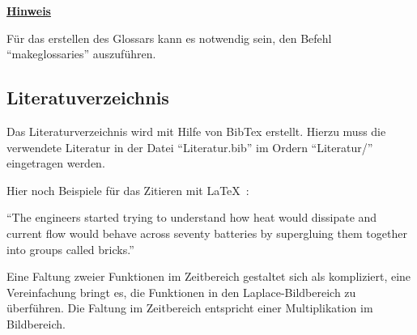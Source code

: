 \underline{\textbf{Hinweis}}

Für das erstellen des Glossars kann es notwendig sein, den Befehl \enquote{makeglossaries} auszuführen.

\subsection{Literatuverzeichnis}

Das Literaturverzeichnis wird mit Hilfe von BibTex erstellt. Hierzu muss die verwendete Literatur in der Datei \enquote{Literatur.bib} im Ordern \enquote{Literatur/} eingetragen werden.

Hier noch Beispiele für das Zitieren mit \LaTeX\ :

\enquote{The engineers started trying to understand how heat would dissipate and current flow would behave across seventy batteries by supergluing them together into groups called bricks.} \cite[S. 158]{Vance2016}

Eine Faltung zweier Funktionen im Zeitbereich gestaltet sich als kompliziert, eine Vereinfachung bringt es, die Funktionen in den Laplace-Bildbereich zu überführen. Die Faltung im Zeitbereich entspricht einer Multiplikation im Bildbereich. \cite[S. 339f]{Papula2006}






















